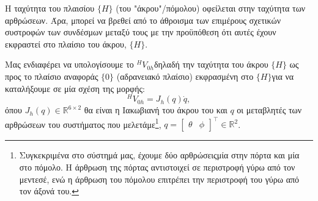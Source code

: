 \documentclass[12pt]{article} %
\numberwithin{equation}{section}  %
\renewenvironment{examplebox}[1]{%
  \ifthenelse{\boolean{showexamples}}%
    {\begin{tcolorbox}[colback=white, colframe=gray!30, title={#1}, sharp corners, boxrule=0.5pt, coltitle=black]}%
    {\expandafter\comment}%
}{%
  \ifthenelse{\boolean{showexamples}}%
    {\end{tcolorbox}}%
    {\expandafter\endcomment}%
}
\begin{document}
    


Η ταχύτητα του πλαισίου $\{H\}$ (του "άκρου"/πόμολου) οφείλεται στην ταχύτητα των αρθρώσεων.
Άρα, μπορεί να βρεθεί από το άθροισμα των επιμέρους σχετικών συστροφών των συνδέσμων μεταξύ τους\textemdash 
με την προϋπόθεση ότι αυτές έχουν εκφραστεί στο πλαίσιο του άκρου, $\{H\}$.

Μας ενδιαφέρει να υπολογίσουμε το $^{H}V_{0h}$\textemdash δηλαδή την ταχύτητα του άκρου $\{H\}$ ως προς το πλαίσιο αναφοράς $\{0\}$ (αδρανειακό πλαίσιο) εκφρασμένη στο $\{H\}$\textemdash για να καταλήξουμε σε μία σχέση της μορφής:
\begin{equation}\label{eq:Jh}
    ^{H}V_{0h} = J_{h}(q) \dot{q},
\end{equation}
όπου $J_{h}(q) \in \mathbb{R}^{6 \times 2}$ θα είναι η Ιακωβιανή του άκρου του και $q$ οι μεταβλητές των αρθρώσεων του συστήματος που μελετάμε\footnote{
Συγκεκριμένα στο σύστημά μας, έχουμε δύο αρθρώσεις\textemdash μία στην πόρτα και μία στο πόμολο.
Η άρθρωση της πόρτας αντιστοιχεί σε περιστροφή γύρω από τον μεντεσέ, ενώ η άρθρωση του πόμολου επιτρέπει την περιστροφή του γύρω από τον άξονά του.
}, 
$q = \begin{bmatrix} \theta & \phi \end{bmatrix} ^{\top} \in \mathbb{R}^2$.
\end{document}
